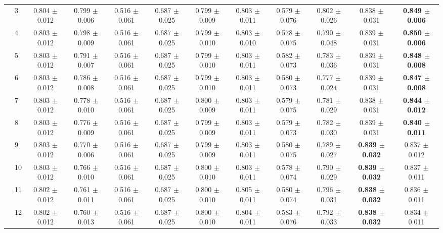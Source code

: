 \begin{table*}[t]
{\begin{tabular}{%
  ll
  @{\quad}
  c@{\hskip 4pt}c
  @{\quad\quad}
  c@{\hskip 4pt}c
  @{\quad\quad}
  c@{\hskip 4pt}c
  @{\quad\quad}
  c@{\hskip 4pt}c
  @{\quad\quad}
  c@{\hskip 4pt}c
}
        & 3 & 0.804 $\pm$ 0.012 & 0.799 $\pm$ 0.006 & 0.516 $\pm$ 0.061 & 0.687 $\pm$ 0.025 & 0.799 $\pm$ 0.009 & 0.803 $\pm$ 0.011 & 0.579 $\pm$ 0.076 & 0.802 $\pm$ 0.026 & 0.838 $\pm$ 0.031 & \textbf{0.849 $\pm$ 0.006} \\
        & 4 & 0.803 $\pm$ 0.012 & 0.798 $\pm$ 0.009 & 0.516 $\pm$ 0.061 & 0.687 $\pm$ 0.025 & 0.799 $\pm$ 0.010 & 0.803 $\pm$ 0.010 & 0.578 $\pm$ 0.075 & 0.790 $\pm$ 0.048 & 0.839 $\pm$ 0.031 & \textbf{0.850 $\pm$ 0.006} \\
        & 5 & 0.803 $\pm$ 0.012 & 0.791 $\pm$ 0.007 & 0.516 $\pm$ 0.061 & 0.687 $\pm$ 0.025 & 0.799 $\pm$ 0.010 & 0.803 $\pm$ 0.011 & 0.582 $\pm$ 0.073 & 0.783 $\pm$ 0.036 & 0.839 $\pm$ 0.031 & \textbf{0.848 $\pm$ 0.008} \\
        & 6 & 0.803 $\pm$ 0.012 & 0.786 $\pm$ 0.008 & 0.516 $\pm$ 0.061 & 0.687 $\pm$ 0.025 & 0.799 $\pm$ 0.010 & 0.803 $\pm$ 0.011 & 0.580 $\pm$ 0.073 & 0.777 $\pm$ 0.024 & 0.839 $\pm$ 0.031 & \textbf{0.847 $\pm$ 0.008} \\
        & 7 & 0.803 $\pm$ 0.012 & 0.778 $\pm$ 0.010 & 0.516 $\pm$ 0.061 & 0.687 $\pm$ 0.025 & 0.800 $\pm$ 0.009 & 0.803 $\pm$ 0.011 & 0.579 $\pm$ 0.075 & 0.781 $\pm$ 0.029 & 0.838 $\pm$ 0.031 & \textbf{0.844 $\pm$ 0.012} \\
        & 8 & 0.803 $\pm$ 0.012 & 0.776 $\pm$ 0.009 & 0.516 $\pm$ 0.061 & 0.687 $\pm$ 0.025 & 0.799 $\pm$ 0.009 & 0.803 $\pm$ 0.011 & 0.579 $\pm$ 0.073 & 0.782 $\pm$ 0.030 & 0.839 $\pm$ 0.031 & \textbf{0.840 $\pm$ 0.011} \\
        & 9 & 0.803 $\pm$ 0.012 & 0.770 $\pm$ 0.006 & 0.516 $\pm$ 0.061 & 0.687 $\pm$ 0.025 & 0.799 $\pm$ 0.009 & 0.803 $\pm$ 0.011 & 0.580 $\pm$ 0.075 & 0.789 $\pm$ 0.027 & \textbf{0.839 $\pm$ 0.032} & 0.837 $\pm$ 0.012 \\
        & 10 & 0.803 $\pm$ 0.012 & 0.766 $\pm$ 0.010 & 0.516 $\pm$ 0.061 & 0.687 $\pm$ 0.025 & 0.800 $\pm$ 0.010 & 0.803 $\pm$ 0.011 & 0.578 $\pm$ 0.074 & 0.790 $\pm$ 0.029 & \textbf{0.839 $\pm$ 0.032} & 0.837 $\pm$ 0.011 \\
        & 11 & 0.802 $\pm$ 0.012 & 0.761 $\pm$ 0.011 & 0.516 $\pm$ 0.061 & 0.687 $\pm$ 0.025 & 0.800 $\pm$ 0.010 & 0.805 $\pm$ 0.011 & 0.580 $\pm$ 0.074 & 0.796 $\pm$ 0.031 & \textbf{0.838 $\pm$ 0.032} & 0.836 $\pm$ 0.011 \\
        & 12 & 0.802 $\pm$ 0.012 & 0.760 $\pm$ 0.013 & 0.516 $\pm$ 0.061 & 0.687 $\pm$ 0.025 & 0.800 $\pm$ 0.010 & 0.804 $\pm$ 0.011 & 0.583 $\pm$ 0.076 & 0.792 $\pm$ 0.033 & \textbf{0.838 $\pm$ 0.032} & 0.834 $\pm$ 0.011 \\

\end{tabular}}
\end{table*}
